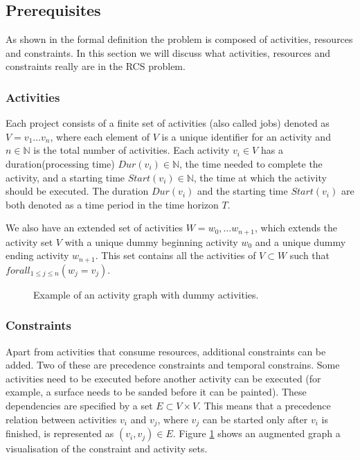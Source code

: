 \documentclass{article}
\newcommand{\dur}[1]{\textit{Dur}(#1)} %
\newcommand{\start}[1]{\textit{Start}(#1)} %
\begin{document}
\subsection{Prerequisites}
As shown in the formal definition the problem is composed of activities, resources and constraints.
In this section we will discuss what activities, resources and constraints really are in the RCS problem.

\subsubsection{Activities}
Each project consists of a finite set of activities (also called jobs) denoted as $V = v_1 \ldots v_n$, where each element of $V$ is a unique identifier for an activity and $n \in \mathbb{N}$ is the total number of activities.
Each activity $v_i \in V$ has a duration(processing time) $\dur{v_i} \in \mathbb{N}$, the time needed to complete the activity, and a starting time $\start{v_i} \in \mathbb{N}$, the time at which the activity should be executed. The duration $\dur{v_i}$ and the starting time $\start{v_i}$ are both denoted as a time period in the time horizon $T$.

We also have an extended set of activities $W = w_0, \ldots w_{n+1}$, which extends the activity set $V$ with a unique dummy beginning activity $w_0$ and a unique dummy ending activity $w_{n+1}$. This set contains all the activities of $V \subset W$ such that $forall_{1 \leq j \leq n}(w_j = v_j)$.

\begin{figure}[h]
	\centering
	
	\caption{Example of an activity graph with dummy activities. }
	\label{fig:activity_graph}
\end{figure}

\subsubsection{Constraints}
Apart from activities that consume resources, additional constraints can be added.
Two of these are precedence constraints and temporal constrains.
Some activities need to be executed before another activity can be executed (for example, a surface needs to be sanded before it can be painted).
These dependencies are specified by a set $E \subset V \times V$.
This means that a precedence relation between activities $v_i$ and $v_j$, where $v_j$ can be started only after $v_i$ is finished, is represented as $(v_i, v_j) \in E$. 
Figure \ref{fig:activity_graph} shows an augmented graph a visualisation of the constraint and activity sets.
\end{document}
